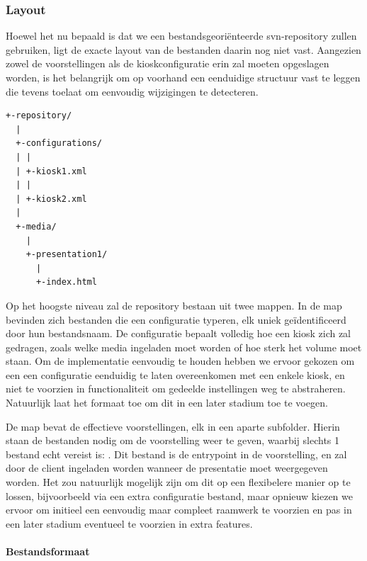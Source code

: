 \subsubsection{Layout}

Hoewel het nu bepaald is dat we een bestandsgeoriënteerde \ac{svn}-repository zullen gebruiken, ligt de exacte layout van de bestanden daarin nog niet vast. Aangezien zowel de voorstellingen als de kioskconfiguratie erin zal moeten opgeslagen worden, is het belangrijk om op voorhand een eenduidige structuur vast te leggen die tevens toelaat om eenvoudig wijzigingen te detecteren.

\begin{lstlisting}[float, caption=Voorbeeld van een repository layout.]
+-repository/
  |
  +-configurations/
  | |
  | +-kiosk1.xml
  | |
  | +-kiosk2.xml
  |
  +-media/
    |
    +-presentation1/
      |
      +-index.html
\end{lstlisting}

Op het hoogste niveau zal de repository bestaan uit twee mappen. In de  map bevinden zich bestanden die een configuratie typeren, elk uniek geïdentificeerd door hun bestandsnaam. De configuratie bepaalt volledig hoe een kiosk zich zal gedragen, zoals welke media ingeladen moet worden of hoe sterk het volume moet staan. Om de implementatie eenvoudig te houden hebben we ervoor gekozen om een een configuratie eenduidig te laten overeenkomen met een enkele kiosk, en niet te voorzien in functionaliteit om gedeelde instellingen weg te abstraheren. Natuurlijk laat het formaat toe om dit in een later stadium toe te voegen.

De  map bevat de effectieve voorstellingen, elk in een aparte subfolder. Hierin staan de bestanden nodig om de voorstelling weer te geven, waarbij slechts 1 bestand echt vereist is: . Dit bestand is de entrypoint in de voorstelling, en zal door de client ingeladen worden wanneer de presentatie moet weergegeven worden. Het zou natuurlijk mogelijk zijn om dit op een flexibelere manier op te lossen, bijvoorbeeld via een extra configuratie bestand, maar opnieuw kiezen we ervoor om initieel een eenvoudig maar compleet raamwerk te voorzien en pas in een later stadium eventueel te voorzien in extra features.

\paragraph{Bestandsformaat}

